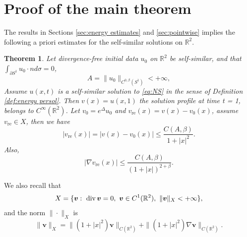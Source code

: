 \documentclass[12pt]{amsart}
\renewcommand{\div}{{\rm div \thinspace }}
\numberwithin{equation}{section}              %
\newtheorem{theorem}{Theorem}[section]
\theoremstyle{remark}
\newcommand{\Bv}{{\boldsymbol{v}}}
\begin{document}
		\section{Proof of the main theorem}\label{sec:mainthm}
		The results in Sections \ref{sec:energy estimates} and \ref{sec:pointwise} implies the
	 following a priori estimates for the self-similar solutions on 	$\mathbb{R}^2$. 
		\begin{theorem}\label{thm:apriotest}
			Let divergence-free initial data $u_0$ on $\mathbb{R}^2$ be self-similar, 
			and that
			$  \int_{\partial S^1} u_0\cdot n d\sigma = 0 $, 
			\begin{equation*}
				A=\|u_0\|_{C^{0,\beta}(S^1)}<+\infty,
			\end{equation*}
			Assume 
			$u(x,t)$ is a self-similar solution to \eqref{eq:NS} in the sense of Definition \ref{def:energy persol}.
			Then $v(x) =  u(x,1)$
			the solution profile at time t = 1, belongs to $C^{\infty}(\mathbb{R}^2)$.
			Let $v_0 = e^{\Delta}u_0$ and $v_{\textrm{re}}(x) = v(x) -v_0 (x)$, assume $v_{\textrm{re}}\in X$, then we have
			\begin{equation*}
				\left|v_{\textrm{re}}(x)\right|	= \left|v(x)- v_0 (x)\right|\leq \frac{C(A,\beta)}{1+|x|^2}.
			\end{equation*}
			Also, 
			\begin{equation*}
				|\nabla v_{\text{re}}(x)| \le \frac{C(A,\beta)}{(1+|x|)^{2+\beta}}.
			\end{equation*}
		\end{theorem}
           We also  recall that 
        \begin{equation}\label{eq:defofX}
				X=\{ \Bv:\ \div \Bv =0, \ \Bv\in C^1(\mathbb{R}^2), ~ \|\Bv\|_{X}<+\infty\},
			\end{equation}
			and the norm $\|\cdot\|_X$ is 
			\begin{equation*}\label{eq:defofnorm1}
				\|\Bv\|_{X}= \|(1+|x|^2)\Bv\|_{C(\mathbb{R}^2)} +\|(1+|x|^2)\nabla \Bv\|_{C(\mathbb{R}^2)}.
			\end{equation*}
            
\end{document}

